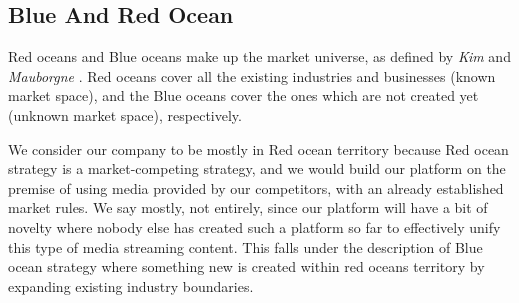 \subsection{Blue And Red Ocean}

Red oceans and Blue oceans make up the market universe, as defined by \textit{Kim} and \textit{Mauborgne} \cite{Blue_ocean_strategy}. Red oceans cover all the existing industries and businesses (known market space), and the Blue oceans cover the ones which are not created yet (unknown market space), respectively.

We consider our company to be mostly in Red ocean territory because Red ocean strategy is a market-competing strategy, and we would build our platform on the premise of using media provided by our competitors, with an already established market rules. We say mostly, not entirely, since our platform will have a bit of novelty where nobody else  has created such a platform so far to effectively unify this type of media streaming content. This falls under the description of Blue ocean strategy where something new is created within red oceans territory by expanding existing industry boundaries.